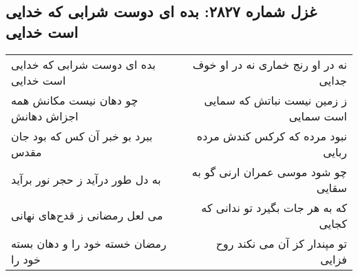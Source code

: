 \begin{center}
\section*{غزل شماره ۲۸۲۷: بده ای دوست شرابی که خدایی است خدایی}
\label{sec:2827}
\begin{longtable}{l p{0.5cm} r}
بده ای دوست شرابی که خدایی است خدایی
&&
نه در او رنج خماری نه در او خوف جدایی
\\
چو دهان نیست مکانش همه اجزاش دهانش
&&
ز زمین نیست نباتش که سمایی است سمایی
\\
ببرد بو خبر آن کس که بود جان مقدس
&&
نبود مرده که کرکس کندش مرده ربایی
\\
به دل طور درآید ز حجر نور برآید
&&
چو شود موسی عمران ارنی گو به سقایی
\\
می لعل رمضانی ز قدح‌های نهانی
&&
که به هر جات بگیرد تو ندانی که کجایی
\\
رمضان خسته خود را و دهان بسته خود را
&&
تو مپندار کز آن می نکند روح فزایی
\\
\end{longtable}
\end{center}

